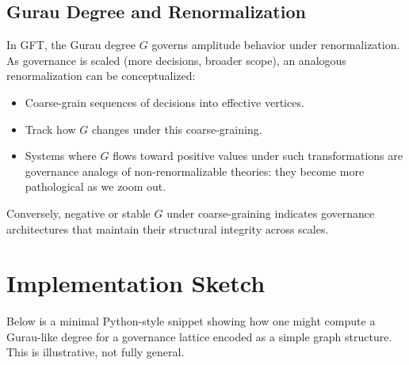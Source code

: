 \documentclass[11pt]{article}
\begin{document}
\subsection{Gurau Degree and Renormalization}

In GFT, the Gurau degree \(G\) governs amplitude behavior under renormalization. As governance is scaled (more decisions, broader scope), an analogous renormalization can be conceptualized:
\begin{itemize}
  \item Coarse-grain sequences of decisions into effective vertices.
  \item Track how \(G\) changes under this coarse-graining.
  \item Systems where \(G\) flows toward positive values under such transformations are governance analogs of non-renormalizable theories: they become more pathological as we zoom out.
\end{itemize}

Conversely, negative or stable \(G\) under coarse-graining indicates governance architectures that maintain their structural integrity across scales.

\section{Implementation Sketch}

Below is a minimal Python-style snippet showing how one might compute a Gurau-like degree for a governance lattice encoded as a simple graph structure. This is illustrative, not fully general.
\end{document}
